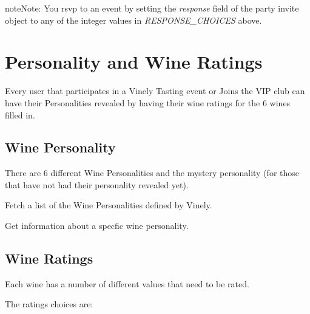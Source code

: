 \documentclass[letterpaper,10pt,english]{sphinxmanual}
\begin{document}
\begin{notice}{note}{Note:}
You rsvp to an event by setting the \emph{response} field of the party invite object to any of the integer values in \emph{RESPONSE\_CHOICES} above.
\end{notice}


\chapter{Personality and Wine Ratings}
\label{personality:ref-personality}\label{personality::doc}\label{personality:personality-and-wine-ratings}
Every user that participates in a Vinely Tasting event or Joins the VIP club
can have their Personalities revealed by having their wine ratings for the 6 wines filled in.


\section{Wine Personality}
\label{personality:wine-personality}
There are 6 different Wine Personalities and the mystery personality
(for those that have not had their personality revealed yet).

Fetch a list of the Wine Personalities defined by Vinely.


\begin{fulllineitems}
\label{personality:get--api-v1-personality-}
\end{fulllineitems}


Get information about a specfic wine personality.


\begin{fulllineitems}
\label{personality:get--api-v1-personality-_id_-}
\end{fulllineitems}



\section{Wine Ratings}
\label{personality:wine-ratings}
Each wine has a number of different values that need to be rated.

The ratings choices are:
\end{document}
